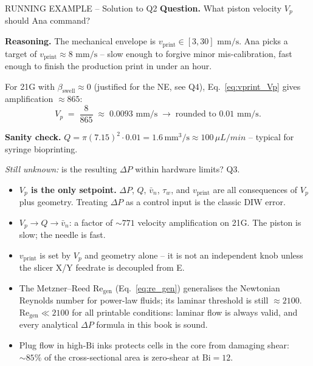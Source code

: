 \documentclass[11pt,a4paper]{article}
\newcommand{\mms}{\,\mathrm{mm/s}}
\newcommand{\Bi}{\mathrm{Bi}}
\newcommand{\Rey}{\mathrm{Re}}
\begin{document}
\begin{runningbox}{RUNNING EXAMPLE -- Solution to Q2}
\textbf{Question.} What piston velocity $V_p$ should Ana command?

\medskip\textbf{Reasoning.} The mechanical envelope is
$v_\mathrm{print}\in[3,30]\,\mms$. Ana picks a target of
$v_\mathrm{print}\approx 8\,\mms$ -- slow enough to forgive minor
mis-calibration, fast enough to finish the production print in under
an hour.

For 21G with $\beta_\mathrm{swell}\approx 0$ (justified for the NE,
see Q4), Eq.~\ref{eq:vprint_Vp} gives amplification $\approx 865$:
\[
V_p \;=\; \frac{8}{865} \;\approx\; 0.0093\,\mms
\;\to\; \text{rounded to } \mathbf{0.01\,\mms}.
\]

\textbf{Sanity check.} $Q=\pi(7.15)^2\cdot 0.01=1.6\,\si{\mm^3/\s}
\approx 100\,\si{\mu L/min}$ -- typical for syringe bioprinting.

\medskip\emph{Still unknown:} is the resulting $\Delta P$ within
hardware limits? Q3.
\end{runningbox}

\begin{takeawaybox}
\begin{itemize}[leftmargin=1.4em,itemsep=2pt]
\item \textbf{$V_p$ is the only setpoint.} $\Delta P$, $Q$, $\bar v_n$,
  $\tau_w$, and $v_\mathrm{print}$ are all consequences of $V_p$ plus
  geometry. Treating $\Delta P$ as a control input is the classic DIW
  error.
\item $V_p\to Q\to\bar v_n$: a factor of $\sim 771$ velocity
  amplification on 21G. The piston is slow; the needle is fast.
\item $v_\mathrm{print}$ is set by $V_p$ and geometry alone -- it is not
  an independent knob unless the slicer X/Y feedrate is decoupled from E.
\item The Metzner--Reed $\Rey_\mathrm{gen}$ (Eq.~\ref{eq:re_gen})
  generalises the Newtonian Reynolds number for power-law fluids; its
  laminar threshold is still $\approx 2100$.
  $\Rey_\mathrm{gen}\ll 2100$ for all printable conditions: laminar
  flow is always valid, and every analytical $\Delta P$ formula in this
  book is sound.
\item Plug flow in high-$\Bi$ inks protects cells in the core from
  damaging shear: $\sim85\%$ of the cross-sectional area is zero-shear
  at $\Bi=12$.
\end{itemize}
\end{takeawaybox}
\end{document}
